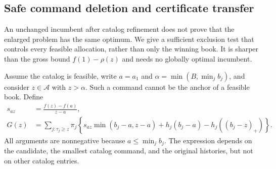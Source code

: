 \subsection{Safe command deletion and certificate transfer}\label{sec:safe53}
An unchanged incumbent after catalog refinement does not prove that the enlarged problem has the same optimum. We give a sufficient exclusion test that controls every feasible allocation, rather than only the winning book. It is sharper than the gross bound $f(1)-\rho(z)$ and needs no globally optimal incumbent.

Assume the catalog is feasible, write $a=a_1$ and $\alpha=\min(B,\min_jb_j)$, and consider $z\in\mathcal A$ with $z>\alpha$. Such a command cannot be the anchor of a feasible book. Define
\begin{align}
 s_{az}&=\frac{f(z)-f(a)}{z-a},\label{eq:anchorslope53}\\
 G(z)&=\sum_{j:\tau_j\geq z}\pi_j\left\{
 s_{az}\min(b_j-a,z-a)+h_j(b_j-a)-h_j((b_j-z)_+)\right\}.\label{eq:anchorgain53}
\end{align}
All arguments are nonnegative because $a\leq\min_jb_j$. The expression depends on the candidate, the smallest catalog command, and the original histories, but not on other catalog entries.

